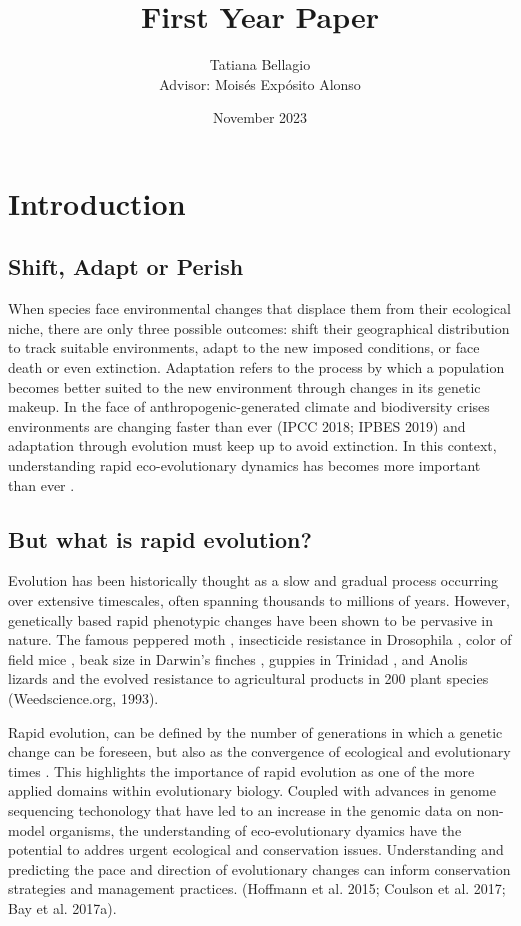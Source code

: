 \documentclass{article}
\title{First Year Paper} %
\author{Tatiana Bellagio \\ Advisor: Moisés Expósito Alonso}
\date{November 2023}
\begin{document}
\maketitle

\tableofcontents
\newpage %

\section{Introduction}
\subsection{Shift, Adapt or Perish}
When species face environmental changes that displace them from their ecological niche, there are only three possible outcomes: shift their geographical distribution to track suitable environments, adapt to the new imposed conditions, or face death or even extinction. Adaptation refers to the process by which a population becomes better suited to the new environment through changes in its genetic makeup. In the face of anthropogenic-generated climate and biodiversity crises environments are changing faster than ever (IPCC 2018; IPBES 2019) and adaptation through evolution must keep up to avoid extinction. In this context, understanding rapid eco-evolutionary dynamics has becomes more important than ever \citep{Waldvogel2020-dh, Palumbi2002-li, Stockwell2003-da}. 

\subsection{But what is rapid evolution?}
Evolution has been historically thought as a slow and gradual process occurring over extensive timescales, often spanning thousands to millions of years. However, genetically based rapid phenotypic changes have been shown to be pervasive in nature. The famous peppered moth \citep{Cook2013-bs}, insecticide resistance in Drosophila \citep{Daborn2002-is}, color of field mice \citep{Vignieri2010-if}, beak size in Darwin’s finches \citep{Grant2008-uc}, guppies in Trinidad \citep{Kemp2009-ji}, and Anolis lizards \citep{Losos2009-vq} and the evolved resistance to agricultural products in  200  plant species (Weedscience.org, 1993). 

Rapid evolution, can be defined by the number of generations in which a genetic change can be foreseen, but also as the convergence of ecological and evolutionary times \citep{Hairston2005-qo}. This highlights the importance of rapid evolution as one of the more applied domains within evolutionary biology. Coupled with advances in genome sequencing techonology that have led to an increase in the genomic data on non-model organisms, the understanding of eco-evolutionary dyamics have the potential to addres urgent ecological and conservation issues. Understanding and predicting the pace and direction of evolutionary changes can inform conservation strategies and management practices.  (Hoffmann  et al. 2015; Coulson et al. 2017; Bay et al. 2017a). 
\end{document}
